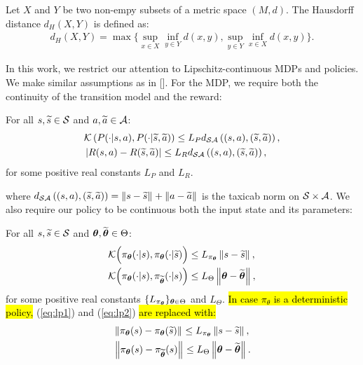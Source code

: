\begin{definition}
	Let $X$ and $Y$ be two non-empy subsets of a metric space $(M,d)$. The Hausdorff distance $d_{H}(X,Y)$ is defined as:
	\begin{align}
		d_{H}(X,Y) = \max \Big\{\sup_{x \in X}\inf_{y \in Y}d(x, y), \sup_{y \in Y}\inf_{x \in X}d(x,y)\Big\}.
	\end{align}
\end{definition}
\noindent In this work, we restrict our attention to Lipschitz-continuous MDPs and policies. We make similar assumptions as in [\cite{pirotta2015policy}]. For the MDP, we require both the continuity of the transition model and the reward:
%
\begin{assumption}\label{ass:lipmdp}
	For all $s,\widetilde{s}\in\mathcal{S}$ and $a,\widetilde{a}\in\mathcal{A}$:
	\begin{align}
	&\mathcal{K}\left(P(\cdot|s,a), P(\cdot| \widetilde{s},\widetilde{a})\right) \leq L_{P}d_{\mathcal{S}\mathcal{A}}\left((s,a),(\widetilde{s},\widetilde{a})\right), \\
	&\left|R(s,a) - R(\widetilde{s},\widetilde{a})\right| \leq L_{R}d_{\mathcal{S}\mathcal{A}}\left((s,a),(\widetilde{s},\widetilde{a})\right),
	\end{align}
	for some positive real constants $L_{P}$ and $L_{R}$.
\end{assumption}
%
\noindent where $d_{\mathcal{S}\mathcal{A}}\left((s,a),(\widetilde{s},\widetilde{a})\right) = \left\|s-\widetilde{s}\right\|_{} + \left\|a-\widetilde{a}\right\|_{}$ is the taxicab norm on $\mathcal{S}\times\mathcal{A}$.
We also require our policy to be continuous both \wrt the input state and its parameters:
%
\begin{assumption}\label{ass:lippol}
	For all $s,\widetilde{s}\in\mathcal{S}$ and $\boldsymbol{\theta},\widetilde{\boldsymbol{\theta}}\in\Theta$:
	\begin{align}
	&\mathcal{K}\Big(\pi_{\boldsymbol{\theta}}(\cdot|s),\pi_{\boldsymbol{\theta}}(\cdot|\widetilde{s})\Big) \leq L_{\pi_{\boldsymbol{\theta}}}\left\|s-\widetilde{s}\right\|_{}, \label{eq:lp1}\\
	&\mathcal{K}\Big(\pi_{\boldsymbol{\theta}}(\cdot|s), \pi_{\widetilde{\boldsymbol{\theta}}}(\cdot|s)\Big) \leq L_{\Theta}\left\|\boldsymbol{\theta}-\widetilde{\boldsymbol{\theta}}\right\|_{}, \label{eq:lp2}
	\end{align}
	for some positive real constants $\{L_{\pi_{\boldsymbol{\theta}}}\}_{\boldsymbol{\theta}\in\Theta}$ and $L_{\Theta}$. \hl{In case $\pi_{\theta}$ is a deterministic policy,} (\ref{eq:lp1}) and (\ref{eq:lp2}) \hl{are replaced with:}
	\begin{align}
	&\left\|\pi_{\boldsymbol{\theta}}(s) - \pi_{\boldsymbol{\theta}}(\widetilde{s})\right\|_{} \leq L_{\pi_{\boldsymbol{\theta}}}\left\|s-\widetilde{s}\right\|_{}, \\
	&\left\|\pi_{\boldsymbol{\theta}}(s) - \pi_{\widetilde{\boldsymbol{\theta}}}(s)\right\|_{} \leq L_{\Theta}\left\|\boldsymbol{\theta}-\widetilde{\boldsymbol{\theta}}\right\|_{}.
	\end{align}
\end{assumption}
